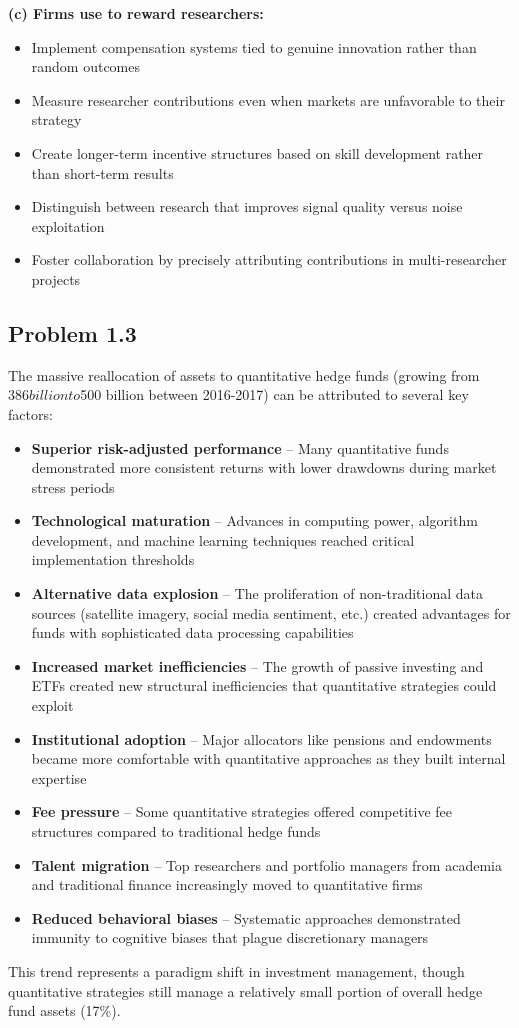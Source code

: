 \documentclass{article}
\begin{document}
\begin{sloppypar}
\textbf{(c) Firms use to reward researchers:}
\begin{itemize}
    \item Implement compensation systems tied to genuine innovation rather than random outcomes
    \item Measure researcher contributions even when markets are unfavorable to their strategy
    \item Create longer-term incentive structures based on skill development rather than short-term results
    \item Distinguish between research that improves signal quality versus noise exploitation
    \item Foster collaboration by precisely attributing contributions in multi-researcher projects
\end{itemize}

\subsection{Problem 1.3}

The massive reallocation of assets to quantitative hedge funds (growing from $386 billion to $500 billion between 2016-2017) can be attributed to several key factors:
\begin{itemize}
\item \textbf{Superior risk-adjusted performance} -- Many quantitative funds demonstrated more consistent returns with lower drawdowns during market stress periods
\item \textbf{Technological maturation} -- Advances in computing power, algorithm development, and machine learning techniques reached critical implementation thresholds
\item \textbf{Alternative data explosion} -- The proliferation of non-traditional data sources (satellite imagery, social media sentiment, etc.) created advantages for funds with sophisticated data processing capabilities
\item \textbf{Increased market inefficiencies} -- The growth of passive investing and ETFs created new structural inefficiencies that quantitative strategies could exploit
\item \textbf{Institutional adoption} -- Major allocators like pensions and endowments became more comfortable with quantitative approaches as they built internal expertise
\item \textbf{Fee pressure} -- Some quantitative strategies offered competitive fee structures compared to traditional hedge funds
\item \textbf{Talent migration} -- Top researchers and portfolio managers from academia and traditional finance increasingly moved to quantitative firms
\item \textbf{Reduced behavioral biases} -- Systematic approaches demonstrated immunity to cognitive biases that plague discretionary managers
\end{itemize}
This trend represents a paradigm shift in investment management, though quantitative strategies still manage a relatively small portion of overall hedge fund assets (17\%).


\end{sloppypar}
\end{document}
